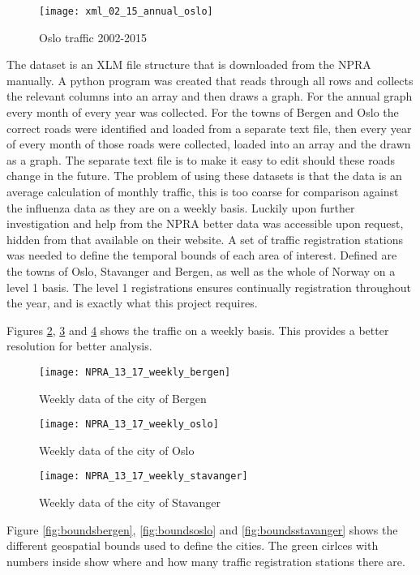 \begin{figure}[ht]
\texttt{[image: xml\_02\_15\_annual\_oslo]}
\centering
\caption{Oslo traffic 2002-2015}
\label{fig:anualoslo}
\end{figure}
The dataset is an XLM file structure that is downloaded from the NPRA manually. A python program was created that reads through all rows and collects the relevant columns into an array and then draws a graph. For the annual graph every month of every year was collected. For the towns of Bergen and Oslo the correct roads were identified and loaded from a separate text file, then every year of every month of those roads were collected, loaded into an array and the drawn as a graph. The separate text file is to make it easy to edit should these roads change in the future.
The problem of using these datasets is that the data is an average calculation of monthly traffic, this is too coarse for comparison against the influenza data as they are on a weekly basis. Luckily upon further investigation and help from the NPRA better data was accessible upon request, hidden from that available on their website. A set of traffic registration stations was needed to define the temporal bounds of each area of interest. Defined are the towns of Oslo, Stavanger and Bergen, as well as the whole of Norway on a level 1 basis. The level 1 registrations ensures continually registration throughout the year, and is exactly what this project requires.

Figures \ref{fig:weeklybergen}, \ref{fig:weeklyoslo} and \ref{fig:weeklystavanger} shows the traffic on a weekly basis. This provides a better resolution for better analysis.
\begin{figure}[ht]
\texttt{[image: NPRA\_13\_17\_weekly\_bergen]}
\centering
\caption{Weekly data of the city of Bergen}
\label{fig:weeklybergen}
\end{figure}

\begin{figure}[ht]
\texttt{[image: NPRA\_13\_17\_weekly\_oslo]}
\centering
\caption{Weekly data of the city of Oslo}
\label{fig:weeklyoslo}
\end{figure}

\begin{figure}[ht]
\texttt{[image: NPRA\_13\_17\_weekly\_stavanger]}
\centering
\caption{Weekly data of the city of Stavanger}
\label{fig:weeklystavanger}
\end{figure}

Figure \ref{fig:boundsbergen}, \ref{fig:boundsoslo} and \ref{fig:boundsstavanger} shows the different geospatial bounds used to define the cities. The green cirlces with numbers inside show where and how many traffic registration stations there are.

